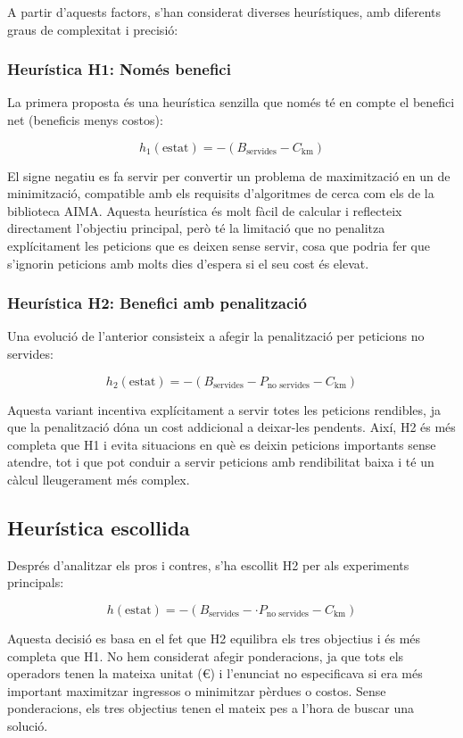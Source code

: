 A partir d’aquests factors, s’han considerat diverses heurístiques, amb diferents graus de complexitat i precisió:

\subsubsection{Heurística H1: Només benefici}

La primera proposta és una heurística senzilla que només té en compte el benefici net (beneficis menys costos):

\begin{equation}
h_1(\text{estat}) = -(B_{\text{servides}} - C_{\text{km}})
\end{equation}

El signe negatiu es fa servir per convertir un problema de maximització en un de minimització, compatible amb els requisits d’algoritmes de cerca com els de la biblioteca AIMA. Aquesta heurística és molt fàcil de calcular i reflecteix directament l’objectiu principal, però té la limitació que no penalitza explícitament les peticions que es deixen sense servir, cosa que podria fer que s’ignorin peticions amb molts dies d’espera si el seu cost és elevat.

\subsubsection{Heurística H2: Benefici amb penalització}

Una evolució de l’anterior consisteix a afegir la penalització per peticions no servides:

\begin{equation}
h_2(\text{estat}) = -(B_{\text{servides}} - P_{\text{no servides}} - C_{\text{km}})
\end{equation}

Aquesta variant incentiva explícitament a servir totes les peticions rendibles, ja que la penalització dóna un cost addicional a deixar-les pendents. Així, H2 és més completa que H1 i evita situacions en què es deixin peticions importants sense atendre, tot i que pot conduir a servir peticions amb rendibilitat baixa i té un càlcul lleugerament més complex.

\subsection{Heurística escollida}

Després d’analitzar els pros i contres, s’ha escollit H2 per als experiments principals:

\begin{equation}
h(\text{estat}) = -(B_{\text{servides}} - \cdot P_{\text{no servides}} - C_{\text{km}})
\end{equation}

Aquesta decisió es basa en el fet que H2 equilibra els tres objectius i és més completa que H1. No hem considerat afegir ponderacions, ja que tots els operadors tenen la mateixa unitat (€) i l'enunciat no especificava si era més important maximitzar ingressos o minimitzar pèrdues o costos. Sense ponderacions, els tres objectius tenen el mateix pes a l'hora de buscar una solució.
